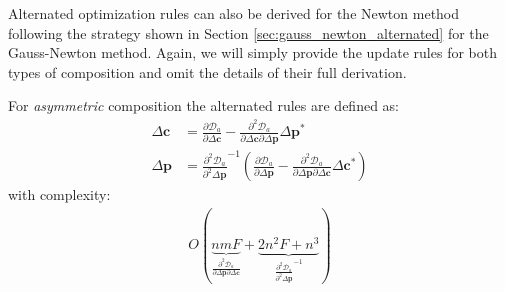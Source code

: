 Alternated optimization rules can also be derived for the Newton method following the strategy shown in Section \ref{sec:gauss_newton_alternated} for the Gauss-Newton method. Again, we will simply provide the update rules for both types of composition and omit the details of their full derivation.

For \emph{asymmetric} composition the alternated rules are defined as:
\begin{equation}
    \begin{aligned}
        \Delta \mathbf{c} & = \frac{\partial \mathcal{D}_a}{\partial \Delta \mathbf{c}} - \frac{\partial^2 \mathcal{D}_a}{\partial \Delta \mathbf{c} \partial \Delta \mathbf{p}} \Delta \mathbf{p}^*
        \\
        \Delta \mathbf{p} & = \frac{\partial^2 \mathcal{D}_a}{\partial^2 \Delta \mathbf{p}}^{-1} \left( \frac{\partial \mathcal{D}_a}{\partial \Delta \mathbf{p}} - \frac{\partial^2 \mathcal{D}_a}{\partial \Delta \mathbf{p} \partial \Delta \mathbf{c}} \Delta \mathbf{c}^* \right)
        \label{eq:asymmetric_newton_alternated_solution}
    \end{aligned}
\end{equation}
with complexity:
\begin{equation}
    \begin{aligned}
        O(
        \underbrace{nmF}_{\frac{\partial^2 \mathcal{D}_a}{\partial \Delta \mathbf{p} \partial \Delta \mathbf{c}}}
        +
        \underbrace{2n^2F + n^3}_{\frac{\partial^2 \mathcal{D}_a}{\partial^2 \Delta \mathbf{p}}^{-1}}
        )
    \label{eq:complexity_alt_asymmetric_newton}
    \end{aligned}
\end{equation}

